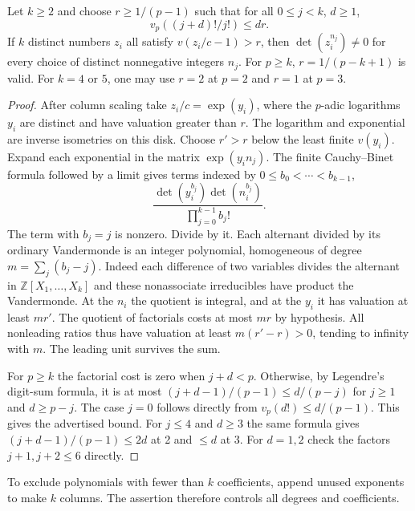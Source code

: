 \begin{lemma}\label{lem:disk}
Let $k\ge2$ and choose $r\ge 1/(p-1)$ such that for all $0\le j<k$, $d\ge1$,
\[
             v_p((j+d)!/j!)\le dr.
\]
If $k$ distinct numbers $z_i$ all satisfy $v(z_i/c-1)>r$, then
$\det(z_i^{n_j})\ne0$ for every choice of distinct nonnegative integers $n_j$.
For $p\ge k$, $r=1/(p-k+1)$ is valid. For $k=4$ or $5$, one may use $r=2$ at $p=2$ and $r=1$ at $p=3$.
\end{lemma}
\begin{proof}
After column scaling take $z_i/c=\exp(y_i)$, where the $p$-adic logarithms $y_i$ are distinct and have valuation greater than $r$. The logarithm and exponential are inverse isometries on this disk. Choose $r'>r$ below the least finite $v(y_i)$.
Expand each exponential in the matrix $\exp(y_i n_j)$. The finite Cauchy--Binet formula followed by a limit gives terms indexed by $0\le b_0<\cdots<b_{k-1}$,
\[
 \frac{\det(y_i^{b_j})\det(n_i^{b_j})}{\prod_{j=0}^{k-1} b_j!}.
\]
The term with $b_j=j$ is nonzero. Divide by it. Each alternant divided by its ordinary Vandermonde is an integer polynomial, homogeneous of degree $m=\sum_j(b_j-j)$. Indeed each difference of two variables divides the alternant in $\mathbb Z[X_1,\ldots,X_k]$ and these nonassociate irreducibles have product the Vandermonde. At the $n_i$ the quotient is integral, and at the $y_i$ it has valuation at least $mr'$. The quotient of factorials costs at most $mr$ by hypothesis. All nonleading ratios thus have valuation at least $m(r'-r)>0$, tending to infinity with $m$. The leading unit survives the sum.

For $p\ge k$ the factorial cost is zero when $j+d<p$. Otherwise, by Legendre's digit-sum formula, it is at most $(j+d-1)/(p-1)\le d/(p-j)$ for $j\ge1$ and $d\ge p-j$. The case $j=0$ follows directly from $v_p(d!)\le d/(p-1)$. This gives the advertised bound. For $j\le4$ and $d\ge3$ the same formula gives $(j+d-1)/(p-1)\le 2d$ at 2 and $\le d$ at 3. For $d=1,2$ check the factors $j+1,j+2\le6$ directly.
\end{proof}

To exclude polynomials with fewer than $k$ coefficients, append unused exponents to make $k$ columns. The assertion therefore controls all degrees and coefficients.

